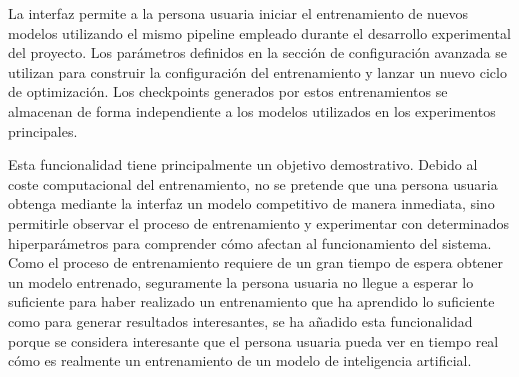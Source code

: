 La interfaz permite a la persona usuaria iniciar el entrenamiento de nuevos modelos utilizando el mismo pipeline empleado durante el desarrollo experimental del proyecto. Los parámetros definidos en la sección de configuración avanzada se utilizan para construir la configuración del entrenamiento y lanzar un nuevo ciclo de optimización. Los checkpoints generados por estos entrenamientos se almacenan de forma independiente a los modelos utilizados en los experimentos principales.

Esta funcionalidad tiene principalmente un objetivo demostrativo. Debido al coste computacional del entrenamiento, no se pretende que una persona usuaria obtenga mediante la interfaz un modelo competitivo de manera inmediata, sino permitirle observar el proceso de entrenamiento y experimentar con determinados hiperparámetros para comprender cómo afectan al funcionamiento del sistema.
Como el proceso de entrenamiento requiere de un gran tiempo de espera obtener un modelo entrenado, seguramente la persona usuaria no llegue a esperar lo suficiente para haber realizado un entrenamiento que ha aprendido lo suficiente como para generar resultados interesantes, se ha añadido esta funcionalidad porque se 
considera interesante que el persona usuaria pueda ver en tiempo real cómo es realmente un entrenamiento de un modelo de inteligencia artificial.